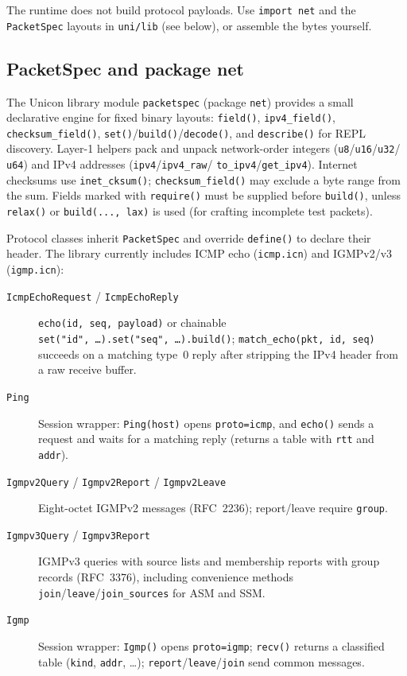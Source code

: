 The runtime does not build protocol payloads. Use
\texttt{import~net} and the \texttt{PacketSpec} layouts in
\texttt{uni/lib} (see below), or assemble the bytes yourself.

\subsection*{PacketSpec and package net}
The Unicon library module \texttt{packetspec} (package \texttt{net})
provides a small declarative engine for fixed binary layouts:
\texttt{field()}, \texttt{ipv4\_field()}, \texttt{checksum\_field()},
\texttt{set()}/\texttt{build()}/\texttt{decode()}, and
\texttt{describe()} for REPL discovery. Layer-1 helpers pack and
unpack network-order integers (\texttt{u8}/\texttt{u16}/\texttt{u32}/
\texttt{u64}) and IPv4 addresses (\texttt{ipv4}/\texttt{ipv4\_raw}/
\texttt{to\_ipv4}/\texttt{get\_ipv4}). Internet checksums use
\texttt{inet\_cksum()}; \texttt{checksum\_field()} may exclude a
byte range from the sum. Fields marked with \texttt{require()}
must be supplied before \texttt{build()}, unless
\texttt{relax()} or \texttt{build(..., lax)} is used (for
crafting incomplete test packets).

Protocol classes inherit \texttt{PacketSpec} and override
\texttt{define()} to declare their header. The library currently
includes ICMP echo (\texttt{icmp.icn}) and IGMPv2/v3
(\texttt{igmp.icn}):

\begin{description}
\item[\texttt{IcmpEchoRequest} / \texttt{IcmpEchoReply}]
\texttt{echo(id, seq, payload)} or chainable
\texttt{set("id",~…)\allowbreak.set("seq",~…)\allowbreak.build()};
\texttt{match\_echo(pkt, id, seq)} succeeds on a matching type~0
reply after stripping the IPv4 header from a raw receive buffer.
\item[\texttt{Ping}]
Session wrapper: \texttt{Ping(host)} opens
\texttt{proto=icmp}, and \texttt{echo()} sends a request and waits
for a matching reply (returns a table with \texttt{rtt} and
\texttt{addr}).
\item[\texttt{Igmpv2Query} / \texttt{Igmpv2Report} / \texttt{Igmpv2Leave}]
Eight-octet IGMPv2 messages (RFC~2236); report/leave require
\texttt{group}.
\item[\texttt{Igmpv3Query} / \texttt{Igmpv3Report}]
IGMPv3 queries with source lists and membership reports with group
records (RFC~3376), including convenience methods
\texttt{join}/\texttt{leave}/\texttt{join\_sources} for ASM and SSM.
\item[\texttt{Igmp}]
Session wrapper: \texttt{Igmp()} opens \texttt{proto=igmp};
\texttt{recv()} returns a classified table (\texttt{kind},
\texttt{addr}, \ldots); \texttt{report}/\texttt{leave}/\texttt{join}
send common messages.
\end{description}

